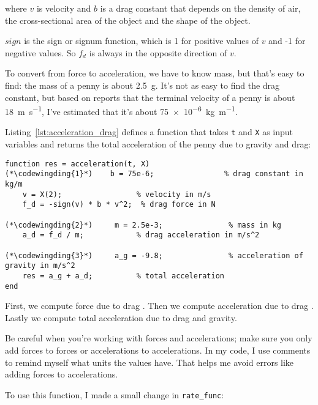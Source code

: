 where $v$ is velocity and
$b$ is a drag constant that depends on the density of
air, the cross-sectional area of the object and the shape
of the object.  

$sign$ is the sign or signum function, which is 1 for positive values of 
$v$ and -1 for negative values.  So $f_d$ is always in the opposite direction of $v$.


To convert from force to acceleration, we have to know mass, but that's easy to find: the mass of a penny is about \SI{2.5}{\gram}.  It's not as easy to find the drag constant, but based on reports that the terminal velocity of a penny is about \SI{18}{\meter \per \second}, I've estimated that it's about \SI{75e-6}{\kilogram \per \meter}.

Listing~\ref{lst:acceleration_drag} defines a function that takes {\tt t} and {\tt X} as input variables and returns the total acceleration of the penny due to gravity and drag:

\begin{lstlisting}[caption={Calculating acceleration of a penny with drag}, label={lst:acceleration_drag}]
function res = acceleration(t, X)
(*\codewingding{1}*)    b = 75e-6;                % drag constant in kg/m
    v = X(2);                 % velocity in m/s
    f_d = -sign(v) * b * v^2;  % drag force in N

(*\codewingding{2}*)     m = 2.5e-3;               % mass in kg
    a_d = f_d / m;            % drag acceleration in m/s^2

(*\codewingding{3}*)     a_g = -9.8;               % acceleration of gravity in m/s^2
    res = a_g + a_d;          % total acceleration
end
\end{lstlisting}

First, we compute force due to drag .
Then we compute acceleration due to drag .
Lastly we compute total acceleration due to drag and gravity.


Be careful when you're working with forces and accelerations; make sure
you only add forces to forces or accelerations to accelerations.  In my
code, I use comments to remind myself what units the values have.
That helps me avoid errors like adding forces to accelerations.

To use this function, I made a small change in \verb"rate_func":

